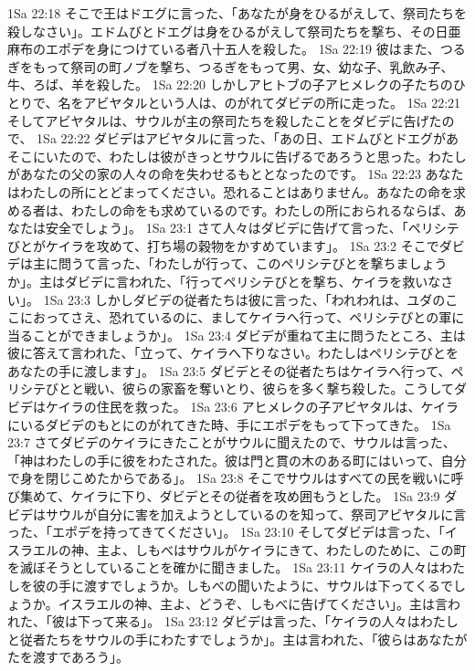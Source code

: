 1Sa 22:18  そこで王はドエグに言った、「あなたが身をひるがえして、祭司たちを殺しなさい」。エドムびとドエグは身をひるがえして祭司たちを撃ち、その日亜麻布のエポデを身につけている者八十五人を殺した。
1Sa 22:19  彼はまた、つるぎをもって祭司の町ノブを撃ち、つるぎをもって男、女、幼な子、乳飲み子、牛、ろば、羊を殺した。
1Sa 22:20  しかしアヒトブの子アヒメレクの子たちのひとりで、名をアビヤタルという人は、のがれてダビデの所に走った。
1Sa 22:21  そしてアビヤタルは、サウルが主の祭司たちを殺したことをダビデに告げたので、
1Sa 22:22  ダビデはアビヤタルに言った、「あの日、エドムびとドエグがあそこにいたので、わたしは彼がきっとサウルに告げるであろうと思った。わたしがあなたの父の家の人々の命を失わせるもととなったのです。
1Sa 22:23  あなたはわたしの所にとどまってください。恐れることはありません。あなたの命を求める者は、わたしの命をも求めているのです。わたしの所におられるならば、あなたは安全でしょう」。
1Sa 23:1  さて人々はダビデに告げて言った、「ペリシテびとがケイラを攻めて、打ち場の穀物をかすめています」。
1Sa 23:2  そこでダビデは主に問うて言った、「わたしが行って、このペリシテびとを撃ちましょうか」。主はダビデに言われた、「行ってペリシテびとを撃ち、ケイラを救いなさい」。
1Sa 23:3  しかしダビデの従者たちは彼に言った、「われわれは、ユダのここにおってさえ、恐れているのに、ましてケイラへ行って、ペリシテびとの軍に当ることができましょうか」。
1Sa 23:4  ダビデが重ねて主に問うたところ、主は彼に答えて言われた、「立って、ケイラへ下りなさい。わたしはペリシテびとをあなたの手に渡します」。
1Sa 23:5  ダビデとその従者たちはケイラへ行って、ペリシテびとと戦い、彼らの家畜を奪いとり、彼らを多く撃ち殺した。こうしてダビデはケイラの住民を救った。
1Sa 23:6  アヒメレクの子アビヤタルは、ケイラにいるダビデのもとにのがれてきた時、手にエポデをもって下ってきた。
1Sa 23:7  さてダビデのケイラにきたことがサウルに聞えたので、サウルは言った、「神はわたしの手に彼をわたされた。彼は門と貫の木のある町にはいって、自分で身を閉じこめたからである」。
1Sa 23:8  そこでサウルはすべての民を戦いに呼び集めて、ケイラに下り、ダビデとその従者を攻め囲もうとした。
1Sa 23:9  ダビデはサウルが自分に害を加えようとしているのを知って、祭司アビヤタルに言った、「エポデを持ってきてください」。
1Sa 23:10  そしてダビデは言った、「イスラエルの神、主よ、しもべはサウルがケイラにきて、わたしのために、この町を滅ぼそうとしていることを確かに聞きました。
1Sa 23:11  ケイラの人々はわたしを彼の手に渡すでしょうか。しもべの聞いたように、サウルは下ってくるでしょうか。イスラエルの神、主よ、どうぞ、しもべに告げてください」。主は言われた、「彼は下って来る」。
1Sa 23:12  ダビデは言った、「ケイラの人々はわたしと従者たちをサウルの手にわたすでしょうか」。主は言われた、「彼らはあなたがたを渡すであろう」。
